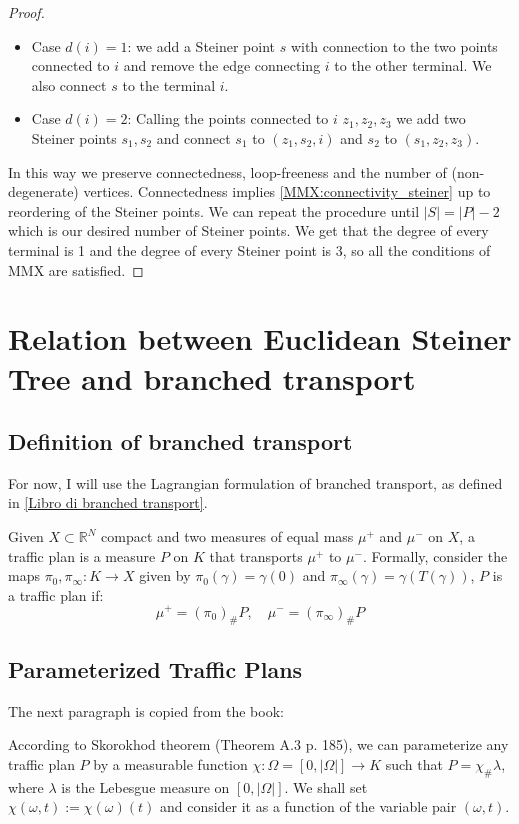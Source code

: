 \begin{proof}
\begin{itemize}
        \item Case $d(i) = 1 $: we add a Steiner point $s$ with connection to the two points connected to $i$ and remove the edge
        connecting $i$ to the other terminal. We also connect $s$ to the terminal $i$.

        \item Case $d(i) = 2$: Calling the points connected to $i$ $z_1, z_2, z_3$ we add two Steiner points $s_1, s_2$ and connect
        $s_1$ to $(z_1, s_2, i)$ and $s_2$ to $(s_1, z_2, z_3)$.
    \end{itemize}

    In this way we preserve connectedness, loop-freeness and the number of (non-degenerate) vertices. Connectedness implies
    \ref{MMX:connectivity_steiner} up to reordering of the Steiner points.
    We can repeat the procedure until $|S| = |P| - 2$ which is our desired number of Steiner points.
    We get that the degree of every terminal is 1 and the degree of every Steiner point is 3, so all the conditions
    of MMX are satisfied.


\end{proof}


\section{Relation between Euclidean Steiner Tree and branched transport}

\subsection{Definition of branched transport}
For now, I will use the Lagrangian formulation of branched transport, as defined in \ref{Libro di branched transport}.

Given $X \subset \mathbb{R}^N$ compact and two measures of equal mass $\mu^+$ and $\mu^-$ on $X$, a traffic plan is
a measure $P$ on $K$ that transports $\mu^+$ to $\mu^-$.
Formally, consider the maps $\pi_0, \pi_\infty : K \rightarrow X$ given by $\pi_0(\gamma) = \gamma(0)$ and $\pi_\infty(\gamma) = \gamma(T(\gamma))$,
$P$ is a traffic plan if:
\[
    \mu^+ = (\pi_0)_{\#}P, \quad \mu^- = (\pi_\infty)_{\#}P
\]

\subsection{Parameterized Traffic Plans}
The next paragraph is copied from the book:


According to Skorokhod theorem (Theorem A.3 p. 185), we can parameterize any traffic plan $P$ by a measurable function
$\chi : \Omega = [0, |\Omega|] \rightarrow K$ such that $P = \chi_{\#} \lambda$, where $\lambda$ is the Lebesgue measure
on $[0, |\Omega|]$. We shall set $\chi(\omega, t) := \chi(\omega)(t)$ and consider it as a function of the variable pair
$(\omega, t)$.

